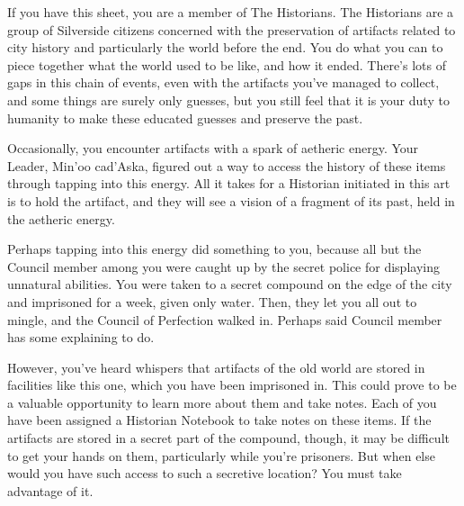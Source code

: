 \documentclass[blue]{Silversiders}
\begin{document}
\name{\bHistorians{}}

If you have this sheet, you are a member of The Historians. The Historians are a group of Silverside citizens concerned with the preservation of artifacts related to city history and particularly the world before the end. You do what you can to piece together what the world used to be like, and how it ended. There's lots of gaps in this chain of events, even with the artifacts you've managed to collect, and some things are surely only guesses, but you still feel that it is your duty to humanity to make these educated guesses and preserve the past.

Occasionally, you encounter artifacts with a spark of aetheric energy. Your Leader, Min'oo cad'Aska, figured out a way to access the history of these items through tapping into this energy. All it takes for a Historian initiated in this art is to hold the artifact, and they will see a vision of a fragment of its past, held in the aetheric energy.

Perhaps tapping into this energy did something to you, because all but the Council member among you were caught up by the secret police for displaying unnatural abilities. You were taken to a secret compound on the edge of the city and imprisoned for a week, given only water. Then, they let you all out to mingle, and the Council of Perfection walked in. Perhaps said Council member has some explaining to do.

However, you've heard whispers that artifacts of the old world are stored in facilities like this one, which you have been imprisoned in. This could prove to be a valuable opportunity to learn more about them and take notes. Each of you have been assigned a Historian Notebook to take notes on these items. If the artifacts are stored in a secret part of the compound, though, it may be difficult to get your hands on them, particularly while you're prisoners. But when else would you have such access to such a secretive location? You must take advantage of it.

\end{document}
